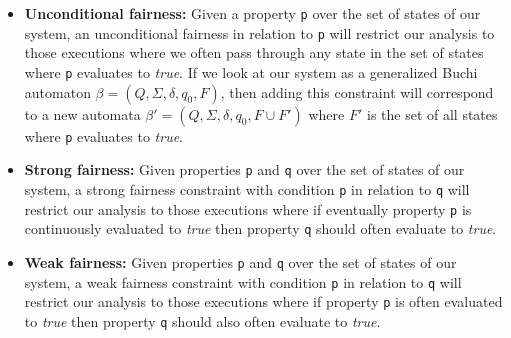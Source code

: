 \documentclass[12pt]{article}
\begin{document}
\begin{itemize}

\item \textbf{Unconditional fairness:} Given a property \texttt{p} over the
set of states of our system, an unconditional fairness in relation to
\texttt{p} will restrict our analysis to those executions where we often pass
through any state in the set of states where \texttt{p} evaluates to
\textit{true}. If we look at our system as a generalized Buchi automaton
$\beta=(Q,\Sigma,\delta,q_{0},F)$, then adding this constraint will correspond
to a new automata $\beta'=(Q,\Sigma,\delta,q_{0},F\cup F')$ where $F'$ is the
set of all states where \texttt{p} evaluates to \textit{true}. 

\item \textbf{Strong fairness:} Given properties \texttt{p} and \texttt{q}
over the set of states of our system, a strong fairness constraint with
condition \texttt{p} in relation to \texttt{q} will restrict our analysis
to those executions where if eventually property \texttt{p} is continuously
evaluated to \textit{true} then property \texttt{q} should often evaluate
to \textit{true}. %

\item \textbf{Weak fairness:} Given properties \texttt{p} and \texttt{q}
over the set of states of our system, a weak fairness constraint with
condition \texttt{p} in relation to \texttt{q} will restrict our analysis
to those executions where if property \texttt{p} is often evaluated to 
\textit{true} then property \texttt{q} should also often evaluate to
\textit{true}. %

\end{itemize}
\end{document}
